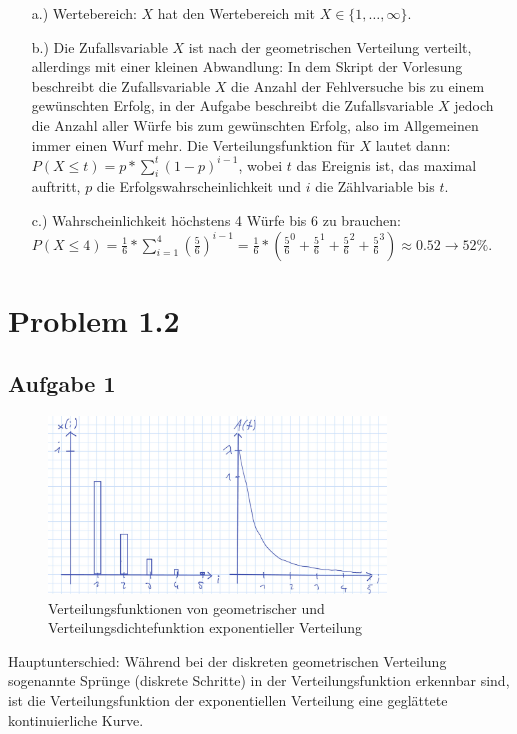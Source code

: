 \documentclass[%
10pt,              %
ngerman,           %
a4paper,           %
DIV11,             %
]{scrartcl}%
\begin{document}
\begin{itemize}
	\item[a.)] Wertebereich: $X$ hat den Wertebereich mit $X \in \{1, \dots, \infty \}$.
	\item[b.)] Die Zufallsvariable $X$ ist nach der geometrischen Verteilung verteilt, allerdings mit einer kleinen Abwandlung: In dem Skript der Vorlesung beschreibt die Zufallsvariable $X$ die Anzahl der Fehlversuche bis zu einem gewünschten Erfolg, in der Aufgabe beschreibt die Zufallsvariable $X$ jedoch die Anzahl aller Würfe bis zum gewünschten Erfolg, also im Allgemeinen immer einen Wurf mehr. Die Verteilungsfunktion für $X$ lautet dann: $P(X \leq t) = p * \sum_{i}^{t} (1-p)^{i-1}$, wobei $t$ das Ereignis ist, das maximal auftritt, $p$ die Erfolgswahrscheinlichkeit und $i$ die Zählvariable bis $t$. 
	\item[c.)] Wahrscheinlichkeit höchstens 4 Würfe bis 6 zu brauchen:\newline
	$P(X \leq 4) = \frac{1}{6} * \sum_{i = 1}^{4} (\frac{5}{6})^{i-1} = \frac{1}{6} * ( \frac{5}{6}^0 + \frac{5}{6}^1 + \frac{5}{6}^2 + \frac{5}{6}^3) \approx 0.52 \rightarrow 52\%$.
\end{itemize}

\section*{Problem 1.2}

\subsection*{Aufgabe 1}

\begin{figure}[!htbp]
  \centering
    \caption{Verteilungsfunktionen von geometrischer und Verteilungsdichtefunktion exponentieller Verteilung}
    \includegraphics[width=0.8\textwidth]{a4vert}
\end{figure}
Hauptunterschied: Während bei der diskreten geometrischen Verteilung sogenannte Sprünge (diskrete Schritte) in der Verteilungsfunktion erkennbar sind, ist die Verteilungsfunktion der exponentiellen Verteilung eine geglättete kontinuierliche Kurve. 
\newpage
\end{document}
